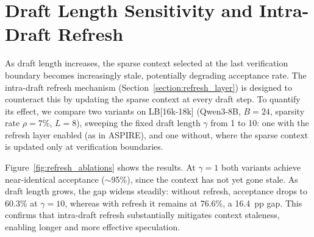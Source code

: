 \section{Draft Length Sensitivity and Intra-Draft Refresh}
\label{appendix:draft_length}

As draft length increases, the sparse context selected at the last verification boundary becomes increasingly stale, potentially degrading acceptance rate. The intra-draft refresh mechanism (Section~\ref{section:refresh_layer}) is designed to counteract this by updating the sparse context at every draft step. To quantify its effect, we compare two variants on LB[16k-18k] (Qwen3-8B, $B{=}24$, sparsity rate $\rho = 7\%$, $L = 8$), sweeping the fixed draft length $\gamma$ from 1 to 10: one with the refresh layer enabled (as in ASPIRE), and one without, where the sparse context is updated only at verification boundaries.

Figure~\ref{fig:refresh_ablations} shows the results. At $\gamma{=}1$ both variants achieve near-identical acceptance (${\sim}$95\%), since the context has not yet gone stale. As draft length grows, the gap widens steadily: without refresh, acceptance drops to 60.3\% at $\gamma{=}10$, whereas with refresh it remains at 76.6\%, a 16.4~pp gap. This confirms that intra-draft refresh substantially mitigates context staleness, enabling longer and more effective speculation.
